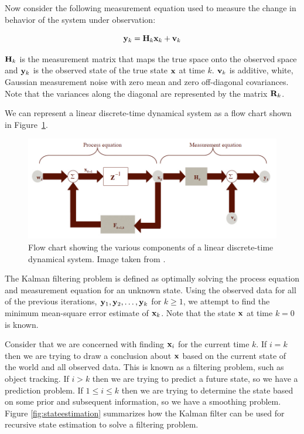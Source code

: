 \documentclass[11pt]{article}
\begin{document}
Now consider the following measurement equation used to measure the change in behavior of the system under observation:

\begin{equation}
{\bf y}_{k} = {\bf H}_{k} {\bf x}_k + {\bf v}_k
\label{eq:measure}
\end{equation}
\vspace{0.01cm}

${\bf H}_{k}$ is the measurement matrix that maps the true space onto the observed space and ${\bf y}_{k}$ is the observed state of the true state ${\bf x}$ at time $k$. ${\bf v}_k$ is additive, white, Gaussian measurement noise with zero mean and zero off-diagonal covariances. Note that the variances along the diagonal are represented by the matrix ${\bf R}_k$.

We can represent a linear discrete-time dynamical system as a flow chart shown in \mbox{Figure \ref{fig:kalmanflow}}.

 \begin{figure}[H]
\centering
\includegraphics[scale=.4]{img/KalmanFlow.jpg}
\caption{Flow chart showing the various components of a linear discrete-time dynamical system. Image taken from \cite{kalman}.}
\label{fig:kalmanflow}
\end{figure}

The Kalman filtering problem is defined as optimally solving the process equation and measurement equation for an unknown state. Using the observed data for all of the previous iterations, ${\bf y}_1, {\bf y}_2, \dots, {\bf y}_k$ for $k \geq 1$, we attempt to find the minimum mean-square error estimate of ${\bf x}_k$. Note that the state ${\bf x}$ at time $k = 0$ is known. 

Consider that we are concerned with finding ${\bf x}_i$ for the current time $k$. If $i = k$ then we are trying to draw a conclusion about ${\bf x}$ based on the current state of the world and all observed data. This is known as a filtering problem, such as object tracking. If $i > k$ then we are trying to predict a future state, so we have a prediction problem. If $1 \leq i \leq k$ then we are trying to determine the state based on some prior and subsequent information, so we have a smoothing problem. Figure \ref{fig:stateestimation} summarizes how the Kalman filter can be used for recursive state estimation to solve a filtering problem.
\end{document}

